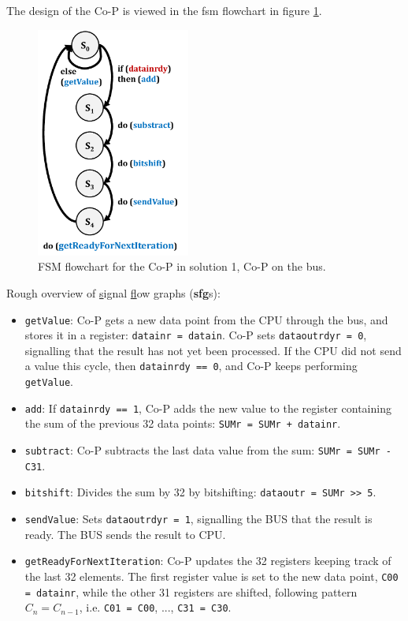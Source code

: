 The design of the Co-P is viewed in the fsm flowchart in figure \ref{fig:fsm1}. 

\begin{figure}[H]
    \centering
    \includegraphics[width=0.45\textwidth]{2Implementation/fig/fsm1.pdf}
    \caption{FSM flowchart for the Co-P in solution 1, Co-P on the bus.}
    \label{fig:fsm1}
\end{figure}


Rough overview of \underline{s}ignal \underline{f}low \underline{g}raphs (\textbf{sfg}s): 
\begin{itemize}
\item \texttt{getValue}: Co-P gets a new data point from the CPU through the bus, and stores it in a register: \texttt{datainr = datain}. Co-P sets \texttt{dataoutrdyr = 0}, signalling that the result has not yet been processed. If the CPU did not send a value this cycle, then \texttt{datainrdy == 0}, and Co-P keeps performing \texttt{getValue}.

\item \texttt{add}: If \texttt{datainrdy == 1}, Co-P adds the new value to the register containing the sum of the previous 32 data points: \texttt{SUMr = SUMr + datainr}.

\item \texttt{subtract}: Co-P subtracts the last data value from the sum: \texttt{SUMr = SUMr - C31}.

\item \texttt{bitshift}: Divides the sum by 32 by bitshifting: \texttt{dataoutr = SUMr >> 5}.

\item \texttt{sendValue}: Sets \texttt{dataoutrdyr = 1}, signalling the BUS that the result is ready. The BUS sends the result to CPU.

\item \texttt{getReadyForNextIteration}: Co-P updates the 32 registers keeping track of the last 32 elements. The first register value is set to the new data point, \texttt{C00 = datainr}, while the other 31 registers are shifted, following pattern $C_n = C_{n-1}$, i.e. \texttt{C01 = C00}, ..., \texttt{C31 = C30}. 
\end{itemize}

